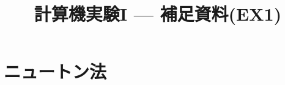 \documentclass[dvipdfmx]{beamer}
\title{計算機実験I --- 補足資料(EX1)}
\begin{document}
\section{ニュートン法}




\end{document}

